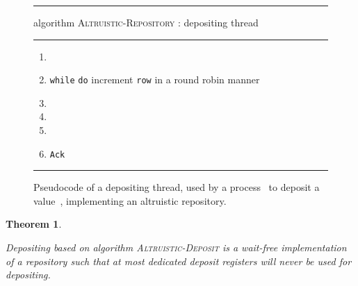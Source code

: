 \documentclass[11pt]{article}
\newcommand{\FF}{\vspace*{\medskipamount}}
\newtheorem{theorem}{Theorem}
\begin{document}
\begin{figure}[t]
\hrule

\FF

\textsf{algorithm} \textsc{Altruistic-Repository} : depositing thread

\FF

\hrule

\FF

\begin{enumerate}[nosep]
\item

\item
\texttt{while}  \texttt{do}
increment \texttt{row} in a round robin manner
\item

\item

\item 

\item
\texttt{Ack}
\end{enumerate}
\FF

\hrule

\FF

\caption{\label{fig:alg-altruistic-repository-deposit}
Pseudocode of a depositing thread, used by a process~ to deposit a value~, implementing an altruistic repository.}
\end{figure}




\begin{theorem}
\label{thm:altruistic-deposit}

Depositing based on algorithm \textsc{Altruistic-Deposit} is a wait-free implementation of a repository such that at most  dedicated deposit registers will never be used for depositing.
\end{theorem}
\end{document}
